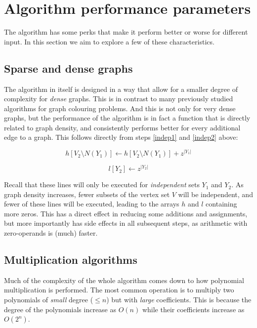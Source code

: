 \documentclass[a4paper]{article}
\begin{document}
\section{Algorithm performance parameters}
The algorithm has some perks that make it perform better or worse for different input. In this section we aim to explore a few of these characteristics.

\subsection{Sparse and dense graphs}\label{sparsedense}
The algorithm in itself is designed in a way that allow for a smaller degree of complexity for \emph{dense} graphs. This is in contrast to many previously studied algorithms for graph colouring problems. And this is not only for very dense graphs, but the performance of the algorithm is in fact a function that is directly related to graph density, and consistently performs better for every additional edge to a graph. This follows directly from steps \ref{indep1} and \ref{indep2} above:

\[ h[V_2 \setminus N(Y_1)] \leftarrow h[V_2 \setminus N(Y_1)] + z^{|Y_1|} \]

\[ l[Y_2] \leftarrow z^{|Y_2|} \]

Recall that these lines will only be executed for \emph{independent} sets $Y_1$ and $Y_2$. As graph density increases, fewer subsets of the vertex set $V$ will be independent, and fewer of these lines will be executed, leading to the arrays $h$ and $l$ containing more zeros. This has a direct effect in reducing some additions and assignments, but more importantly has side effects in all subsequent steps, as arithmetic with zero-operands is (much) faster.



\subsection{Multiplication algorithms}
Much of the complexity of the whole algorithm comes down to how polynomial multiplication is performed. The most common operation is to multiply two polynomials of \emph{small} degree ($\leq n$) but with \emph{large} coefficients. This is because the degree of the polynomials increase as $O(n)$ while their coefficients increase as $O(2^n)$. %
\end{document}
